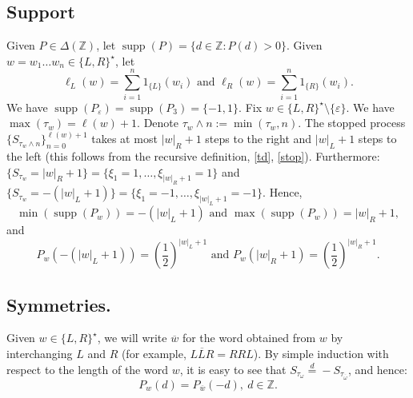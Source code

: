 \documentclass[10pt]{amsart}
\theoremstyle{definition}
\numberwithin{equation}{section}
\newcommand{\eps}{\varepsilon}
\newcommand{\Z}{\mathbb{Z}}
\newcommand{\supp}{\operatorname{supp}}
\begin{document}
\subsection{Support} Given $P\in\Delta(\Z)$,  let $\supp(P)=\{d\in\Z\colon P(d)>0\}$.
 Given $w=w_1\dots w_n\in\{L,R\}^\star$, let 
$$\ell_L(w)=\sum\limits_{i=1}^n 1_{\{L\}}(w_i)\mbox{ and } \ell_R(w)=\sum\limits_{i=1}^n 1_{\{R\}}(w_i).$$
 We have $\supp(P_{\eps})=\supp(P_3)=\{-1,1\}$. Fix $w\in \{L,R\}^\star\setminus\{\eps\}$. We have $\max(\tau_w)=\ell(w)+1$. Denote $\tau_w\wedge n:=\min(\tau_w,n)$. The stopped process $\{S_{\tau_w\wedge n}\}_{n=0}^{\ell(w)+1}$ takes at most $|w|_R+1$ steps to the right  and $|w|_L+1$ steps to the left (this follows from the recursive definition, \eqref{td}, \eqref{stop}).  Furthermore: $ \{S_{\tau_w}=|w|_R+1\}=\{\xi_1=1,\dots,\xi_{|w|_R+1}=1\}$ and $\{S_{\tau_w}=-(|w|_L+1)\}=\{\xi_1=-1,\dots,\xi_{|w|_L+1}=-1\}.$ Hence, $$\min(\supp(P_{w}))=-(|w|_L+1)\mbox{ and }\max(\supp(P_{w}))=|w|_R+1,$$
and
\begin{equation}\label{PWLR}
P_{w}(-(|w|_L+1))=\left(\frac{1}{2}\right) ^{|w|_L+1}\mbox{ and }P_{w}(|w|_R+1)=\left(\frac{1}{2}\right)^{|w|_R+1}.
\end{equation}


\subsection{Symmetries.}\label{symsym}


 Given $w\in\{L,R\}^\star$, we will write $\overline{w}$ for the word obtained from $w$ by interchanging $L$ and $R$ (for example, $\overline{LLR}=RRL$).  By simple induction with respect to the length of the word $w$,  it is easy to see that $ S_{\tau_{\omega}}\stackrel{d}{=}-S_{\tau_{\overline{\omega}}}$, and hence: $$P_w(d)=P_{\overline{w}}(-d),\ d\in\Z.$$ 
\end{document}
